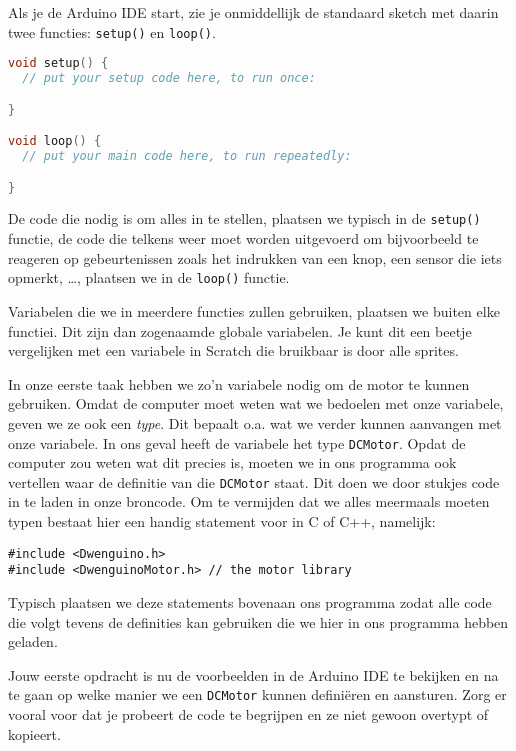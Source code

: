\documentclass[a4paper, 10pt]{article}
\begin{document}
Als je de Arduino IDE start, zie je onmiddellijk de standaard sketch met daarin twee functies: \texttt{setup()} en \texttt{loop()}.

\begin{lstlisting}[language=C++]
void setup() {
  // put your setup code here, to run once:

}

void loop() {
  // put your main code here, to run repeatedly:

}
\end{lstlisting}

De code die nodig is om alles in te stellen, plaatsen we typisch in de \texttt{setup()} functie, de code die telkens weer moet worden
uitgevoerd om bijvoorbeeld te reageren op gebeurtenissen zoals het indrukken van een knop, een sensor die iets opmerkt,
\ldots, plaatsen we in de \texttt{loop()} functie.

Variabelen die we in meerdere functies zullen gebruiken, plaatsen we buiten elke functiei. Dit zijn dan zogenaamde globale
variabelen. Je kunt dit een beetje vergelijken met een variabele in Scratch die bruikbaar is door alle sprites.

In onze eerste taak hebben we zo'n variabele nodig om de motor te kunnen gebruiken. Omdat de computer moet weten wat we
bedoelen met onze variabele, geven we ze ook een {\em type}. Dit bepaalt o.a. wat we verder kunnen aanvangen met onze
variabele. In ons geval heeft de variabele het type \texttt{DCMotor}. Opdat de computer zou weten wat dit precies is,
moeten we in ons programma ook vertellen waar de definitie van die \texttt{DCMotor} staat. Dit doen we door stukjes code
in te laden in onze broncode. Om te vermijden dat we alles meermaals moeten typen bestaat hier een handig statement voor
in C of C++, namelijk:

\begin{lstlisting}
#include <Dwenguino.h>
#include <DwenguinoMotor.h> // the motor library
\end{lstlisting}

Typisch plaatsen we deze statements bovenaan ons programma zodat alle code die volgt tevens de definities kan gebruiken
die we hier in ons programma hebben geladen.

Jouw eerste opdracht is nu de voorbeelden in de Arduino IDE te bekijken en na te gaan op welke manier we een
\texttt{DCMotor} kunnen defini\"eren en aansturen. Zorg er vooral voor dat je probeert de code te begrijpen en ze
niet gewoon overtypt of kopieert.
\end{document}
